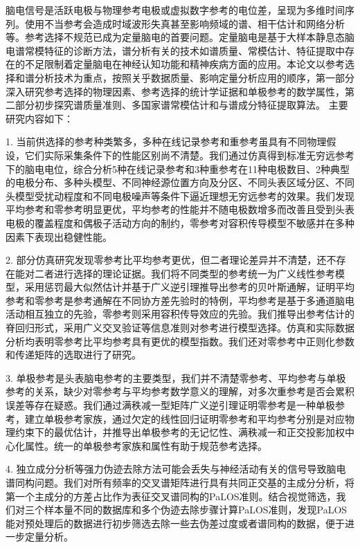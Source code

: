 \begin{chineseabstract}
脑电信号是活跃电极与物理参考电极或虚拟数字参考的电位差，呈现为多维时间序列。使用不当参考会造成时域波形失真甚至影响频域的谱、相干估计和网络分析等。参考选择不规范已成为定量脑电的首要问题。定量脑电是基于大样本静息态脑电谱常模特征的诊断方法，谱分析有关的技术如谱质量、常模估计、特征提取中存在的不足限制着定量脑电在神经认知功能和精神疾病方面的应用。本论文以参考选择和谱分析技术为重点，按照关乎数据质量、影响定量分析应用的顺序，第一部分深入研究参考选择的物理因素、参考选择的统计学证据和单极参考的数学属性，第二部分初步探究谱质量准则、多国家谱常模估计和与谱成分特征提取算法。
主要研究内容如下：

1. 当前供选择的参考种类繁多，多种在线记录参考和重参考虽具有不同物理假设，它们实际采集条件下的性能区别尚不清楚。我们通过仿真得到标准无穷远参考下的脑电电位，综合分析5种在线记录参考和3种重参考在11种电极数目、2种典型的电极分布、多种头模型、不同神经源位置方向及分区、不同头表区域分区、不同头模型受扰动程度和不同电极噪声等条件下逼近理想无穷远参考的效果。我们发现平均参考和零参考明显更优，平均参考的性能并不随电极数增多而改善且受到头表电极的覆盖程度和偶极子活动方向的制约，零参考对容积传导模型不敏感并在多种因素下表现出稳健性能。

2. 部分仿真研究发现零参考比平均参考更优，但二者理论差异并不清楚，还不存在能对二者进行选择的理论证据。我们将不同类型的参考统一为广义线性参考模型，采用惩罚最大似然估计并基于广义逆引理推导出参考的贝叶斯通解，证明平均参考和零参考是参考通解在不同协方差先验时的特例，平均参考是基于多通道脑电活动相互独立的先验，零参考则采用容积传导效应的先验。我们推导出参考估计的脊回归形式，采用广义交叉验证等信息准则对参考进行模型选择。仿真和实际数据分析均表明零参考比平均参考具有更优的模型指数。我们还对零参考中正则化参数和传递矩阵的选取进行了研究。

3. 单极参考是头表脑电参考的主要类型，我们并不清楚零参考、平均参考与单极参考的关系，缺少对零参考与平均参考数学意义的理解，对多次重参考是否会累积误差等存在疑惑。我们通过满秩减一型矩阵广义逆引理证明零参考是一种单极参考，建立单极参考家族，通过欠定的线性回归证明零参考和平均参考分别是对应物理约束下的最优估计，并推导出单极参考的无记忆性、满秩减一和正交投影加权中心化属性。统一的单极参考家族和属性有助于规范参考选择。

4. 独立成分分析等强力伪迹去除方法可能会丢失与神经活动有关的信号导致脑电谱同构问题。我们对所有频率的交叉谱矩阵进行具有共同正交基的主成分分析，将第一个主成分的方差占比作为表征交叉谱同构的PaLOS准则。结合视觉筛选，我们对三个样本量不同的数据库和多个伪迹去除步骤计算PaLOS准则，发现PaLOS能对预处理后的数据进行初步筛选去除一些去伪差过度或者谱同构的数据，便于进一步定量分析。


\end{chineseabstract}
